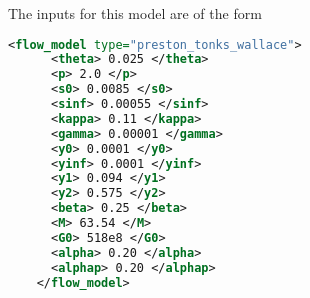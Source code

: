   The inputs for this model are of the form
  \begin{lstlisting}[language=XML]
    <flow_model type="preston_tonks_wallace">
      <theta> 0.025 </theta>
      <p> 2.0 </p>
      <s0> 0.0085 </s0>
      <sinf> 0.00055 </sinf>
      <kappa> 0.11 </kappa>
      <gamma> 0.00001 </gamma>
      <y0> 0.0001 </y0>
      <yinf> 0.0001 </yinf>
      <y1> 0.094 </y1>
      <y2> 0.575 </y2>
      <beta> 0.25 </beta>
      <M> 63.54 </M>
      <G0> 518e8 </G0>
      <alpha> 0.20 </alpha>
      <alphap> 0.20 </alphap>
    </flow_model>
  \end{lstlisting}
